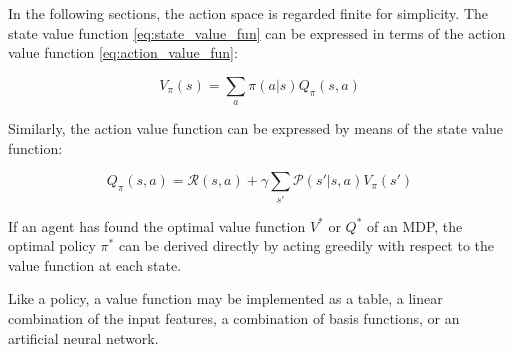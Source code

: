 In the following sections, the action space is regarded finite for simplicity.
The state value function \ref{eq:state_value_fun} can be expressed in terms of the action value function \ref{eq:action_value_fun}:

\begin{equation}
V_\pi(s) = \sum_{a}\pi(a|s)Q_\pi(s,a)
\label{eq:state_value_function_with_q}
\end{equation}

Similarly, the action value function can be expressed by means of the state value function:

\begin{equation}
Q_\pi(s,a)=\mathcal{R}(s,a)+\gamma \sum_{s'}\mathcal{P}(s'|s,a)V_\pi(s')
\label{eq:action_value_function_with_v}
\end{equation}

If an agent has found the optimal value function $V^*$ or $Q^*$ of an MDP, the optimal policy $\pi^*$ can be derived directly by acting greedily with respect to the value function at each state.

Like a policy, a value function may be implemented as a table, a linear combination of the input features, a combination of basis functions, or an artificial neural network.